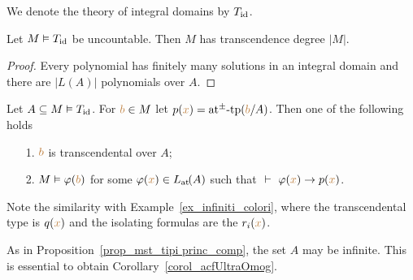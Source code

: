 \documentclass[creche.tex]{subfiles}
\begin{document}
We denote the theory  of integral domains by \emph{$T_{\rm id}$}.


\begin{proposition}
Let $M\models T_{\rm id}$ be uncountable. Then $M$ has transcendence degree $|M|$.
\end{proposition}

\begin{proof}
Every polynomial has finitely many solutions in an integral domain and there are $|L(A)|$ polynomials over $A$.
\end{proof}



\begin{proposition}\label{prop_di_tipi princ_comp}
Let $A\subseteq M\models T_{\rm id}$. For ${\mr b}\in M$ let $p({\mr x})=\atpmtp({\mr b}/A)$. Then one of the following holds  
\begin{itemize}
\item[1.] ${\mr b}$ is transcendental over $A$;
\item[2.] $M\models\phi({\mr b})$ for some $\phi({\mr x})\in\atL(A)$ such that
$\ \proves\ \phi({\mr x})\imp p({\mr x})$.
\end{itemize}\end{proposition}

Note the similarity with Example~\ref{ex_infiniti_colori}, where the transcendental type is $q({\mr x})$ and the isolating formulas are the $r_i({\mr x})$. 

As in Proposition~\ref{prop_mst_tipi princ_comp}, the set $A$ may be infinite. This is essential to obtain Corollary~\ref{corol_acfUltraOmog}.
\end{document}
